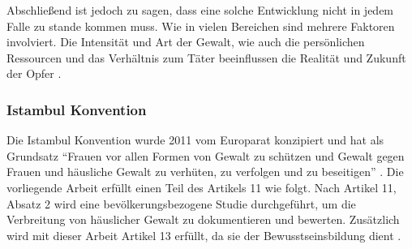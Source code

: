 Abschließend ist jedoch zu sagen, dass eine solche Entwicklung nicht in jedem Falle zu stande kommen muss. Wie in vielen Bereichen sind mehrere Faktoren involviert. Die Intensität und Art der Gewalt, wie auch die persönlichen Ressourcen und das Verhältnis zum Täter beeinflussen die Realität und Zukunft der Opfer \parencite{Def_Form_Folge_Gewalt}.

\subsubsection{Istambul Konvention}     \label{2.1.2.4}
Die Istambul Konvention wurde 2011 vom Europarat konzipiert und hat als Grundsatz \enquote{Frauen vor allen Formen von Gewalt zu schützen und Gewalt gegen Frauen und häusliche Gewalt zu verhüten, zu verfolgen und zu beseitigen} \parencite{Istambul_Konvention}. %
Die vorliegende Arbeit erfüllt einen Teil des Artikels 11 wie folgt. Nach Artikel 11, Absatz 2 wird eine bevölkerungsbezogene Studie durchgeführt, um die Verbreitung von häuslicher Gewalt zu dokumentieren und bewerten. Zusätzlich wird mit dieser Arbeit Artikel 13 erfüllt, da sie der Bewusstseinsbildung dient \parencite{Istambul_Konvention}.